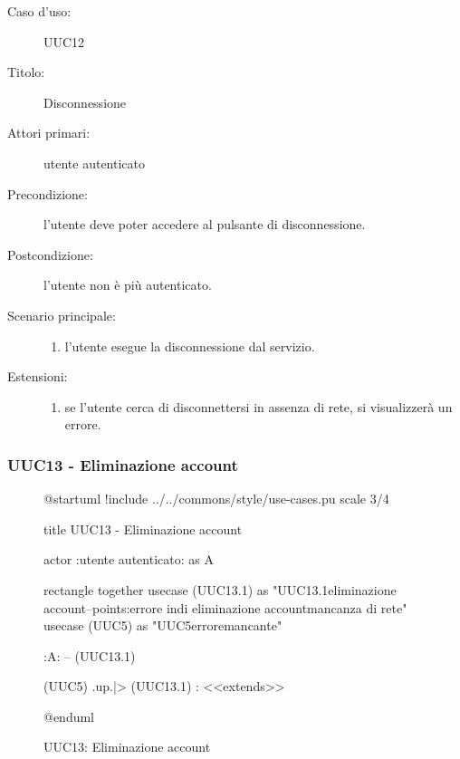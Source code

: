 \documentclass[casi-duso]{subfiles}
\begin{document}
  \begin{description}
  \item[Caso d’uso:] UUC12
  \item[Titolo:] Disconnessione
  \item[Attori primari:] utente autenticato
  \item[Precondizione:] l'utente deve poter accedere al pulsante di disconnessione.
  \item[Postcondizione:] l'utente non è più autenticato.
  \item[Scenario principale:]
        \begin{enumerate}
          \item l'utente esegue la disconnessione dal servizio.
        \end{enumerate}
  \item[Estensioni:]
        \begin{enumerate}
          \item se l'utente cerca di disconnettersi in assenza di rete, si visualizzerà un errore.
        \end{enumerate}
\end{description}

\subsubsection{UUC13 - Eliminazione account}%
\label{subsub:UUC13utente}

\begin{figure}[h!] 
  \centering 
  \begin{plantuml}
  @startuml
  !include ../../commons/style/use-cases.pu
  scale 3/4
  
  title UUC13 - Eliminazione account

  actor :utente autenticato: as A

  rectangle {
    together {
      usecase (UUC13.1) as "UUC13.1\nConferma eliminazione account\n--\nExtension points:\nVisualizzazione errore in\ncaso di eliminazione account\nin mancanza di rete"
      usecase (UUC5) as "UUC5\nVisualizzazione errore\nrete mancante"
    }
  }

  :A: -- (UUC13.1)

  (UUC5) .up.|> (UUC13.1) : <<extends>>

  @enduml
  \end{plantuml} 
  \caption{UUC13: Eliminazione account} 
  \label{fig:uuc13} 
\end{figure}
\end{document}
